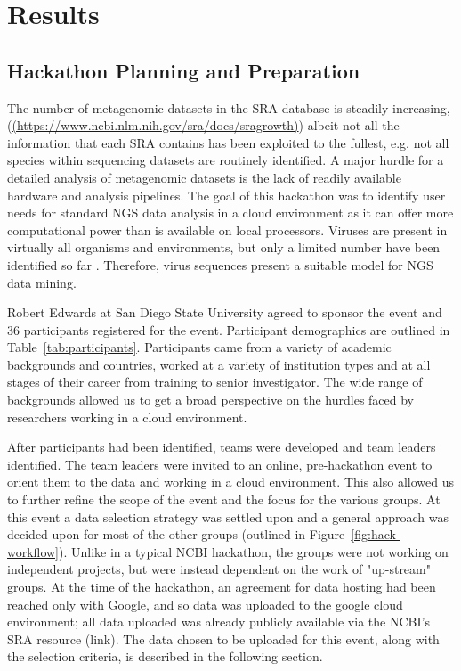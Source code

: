 \section{Results}
  \subsection{Hackathon Planning and Preparation}

  The number of metagenomic datasets in the SRA database is steadily
  increasing, (\url{(https://www.ncbi.nlm.nih.gov/sra/docs/sragrowth)}) albeit
  not all the information that each SRA contains has been exploited to the
  fullest, e.g. not all species within sequencing datasets are routinely
  identified. A major hurdle for a detailed analysis of metagenomic datasets is
  the lack of readily available hardware and analysis pipelines. The goal of
  this hackathon was to identify user needs for  standard NGS data analysis in
  a cloud environment as it can offer more computational power than is
  available on local processors. Viruses are present in virtually all organisms
  and environments, but only a limited number have been identified so far
  \cite{Shi2016}. Therefore, virus sequences present a suitable model for NGS
  data mining.

  Robert Edwards at San Diego State University agreed to sponsor the event and
  36 participants registered for the event. Participant demographics are
  outlined in Table~\ref{tab:participants}. Participants came from a variety of
  academic backgrounds and countries, worked at a variety of institution types
  and at all stages of their career from training to senior investigator. The
  wide range of backgrounds allowed us to get a broad perspective on the
  hurdles faced by researchers working in a cloud environment.

  After participants had been identified, teams were developed and team leaders
  identified. The team leaders were invited to an online, pre-hackathon event
  to orient them to the data and working in a cloud environment. This also
  allowed us to further refine the scope of the event and the focus for the
  various groups. At this event a data selection strategy was settled upon and
  a general approach was decided upon for most of the other groups (outlined in
  Figure~\ref{fig:hack-workflow}). Unlike in a typical NCBI hackathon, the
  groups were not working on independent projects, but were instead dependent
  on the work of "up-stream" groups. At the time of the hackathon, an agreement
  for data hosting had been reached only with Google, and so data was uploaded
  to the google cloud environment; all data uploaded was already publicly
  available via the NCBI's SRA resource (link). The data chosen to be uploaded
  for this event, along with the selection criteria, is described in the
  following section.

